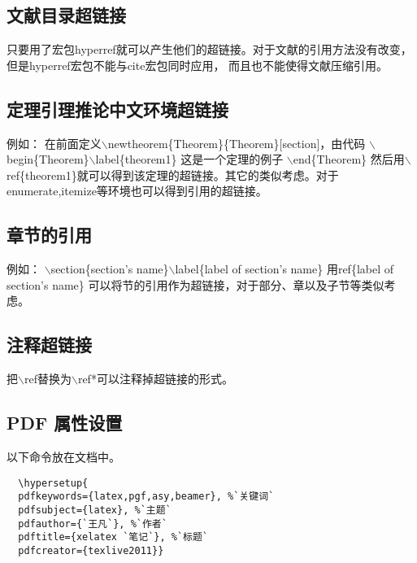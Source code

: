 \subsection{文献目录超链接}
只要用了宏包hyperref就可以产生他们的超链接。对于文献的引用方法没有改变，但是hyperref宏包不能与cite宏包同时应用，
而且也不能使得文献压缩引用。 \newline

\subsection{定理引理推论中文环境超链接}
例如： \newline 在前面定义$\backslash
$newtheorem{\{}Theorem{\}}{\{}Theorem{\}}[section]，由代码 \newline
$\backslash $begin{\{}Theorem{\}}$\backslash $label{\{}theorem1{\}}
\newline 这是一个定理的例子 \newline $\backslash $end{\{}Theorem{\}}
 \newline 然后用$\backslash
$ref{\{}theorem1{\}}就可以得到该定理的超链接。其它的类似考虑。对于enumerate,itemize等环境也可以得到引用的超链接。
\newline
\subsection{章节的引用}
例如： \newline $\backslash $section{\{}section's
name{\}}$\backslash $label{\{}label of section's name{\}} \newline
用ref{\{}label of section's name{\}}
可以将节的引用作为超链接，对于部分、章以及子节等类似考虑。 \newline
\subsection{注释超链接}
把$\backslash $ref替换为$\backslash $ref*可以注释掉超链接的形式。
\newline

\subsection{PDF 属性设置}
以下命令放在文档中。
\begin{lstlisting}
  \hypersetup{
  pdfkeywords={latex,pgf,asy,beamer}, %`关键词`
  pdfsubject={latex}, %`主题`
  pdfauthor={`王凡`}, %`作者`
  pdftitle={xelatex `笔记`}, %`标题`
  pdfcreator={texlive2011}}
\end{lstlisting}

